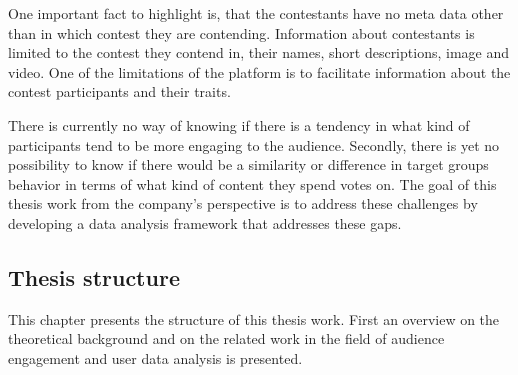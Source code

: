     One important fact to highlight is, that the contestants have no meta data other than in which contest they are contending. Information about contestants is limited to the contest they contend in, their names, short descriptions, image and video. One of the limitations of the platform is to facilitate information about the contest participants and their traits. 
    
    There is currently no way of knowing if there is a tendency in what kind of participants tend to be more engaging to the audience. Secondly, there is yet no possibility to know if there would be a similarity or difference in target groups behavior in terms of what kind of content they spend votes on. The goal of this thesis work from the company's perspective is to address these challenges by developing a data analysis framework that addresses these gaps.

\subsection{Thesis structure}
    This chapter presents the structure of this thesis work. First an overview on the theoretical background and on the related work in the field of audience engagement and user data analysis is presented. %